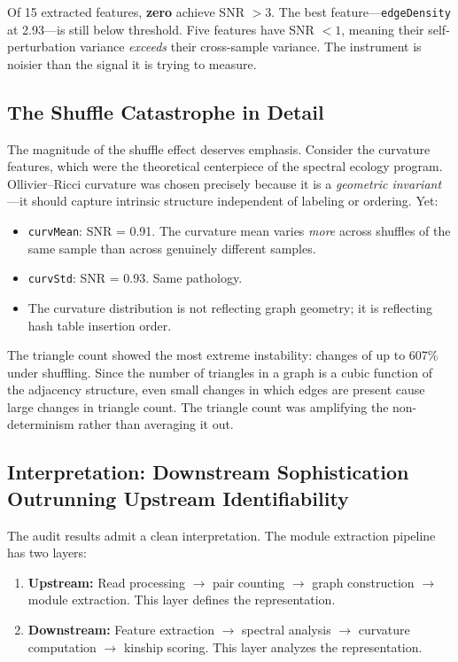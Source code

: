 \documentclass{../yalumba}
\begin{document}
\begin{keyfinding}
Of 15 extracted features, \textbf{zero} achieve SNR $> 3$. The best
feature---\texttt{edgeDensity} at 2.93---is still below threshold. Five features
have SNR $< 1$, meaning their self-perturbation variance \textit{exceeds} their
cross-sample variance. The instrument is noisier than the signal it is trying
to measure.
\end{keyfinding}

\subsection{The Shuffle Catastrophe in Detail}

The magnitude of the shuffle effect deserves emphasis. Consider the curvature
features, which were the theoretical centerpiece of the spectral ecology program.
Ollivier--Ricci curvature was chosen precisely because it is a \textit{geometric
invariant}---it should capture intrinsic structure independent of labeling or
ordering. Yet:

\begin{itemize}[leftmargin=2em]
  \item \texttt{curvMean}: SNR = 0.91. The curvature mean varies \textit{more}
    across shuffles of the same sample than across genuinely different samples.
  \item \texttt{curvStd}: SNR = 0.93. Same pathology.
  \item The curvature distribution is not reflecting graph geometry; it is
    reflecting hash table insertion order.
\end{itemize}

The triangle count showed the most extreme instability: changes of up to 607\%
under shuffling. Since the number of triangles in a graph is a cubic function of
the adjacency structure, even small changes in which edges are present cause
large changes in triangle count. The triangle count was amplifying the
non-determinism rather than averaging it out.

\subsection{Interpretation: Downstream Sophistication Outrunning Upstream
Identifiability}

The audit results admit a clean interpretation. The module extraction pipeline
has two layers:

\begin{enumerate}[leftmargin=2em]
  \item \textbf{Upstream:} Read processing $\to$ pair counting $\to$ graph
    construction $\to$ module extraction. This layer defines the representation.
  \item \textbf{Downstream:} Feature extraction $\to$ spectral analysis $\to$
    curvature computation $\to$ kinship scoring. This layer analyzes the
    representation.
\end{enumerate}
\end{document}
